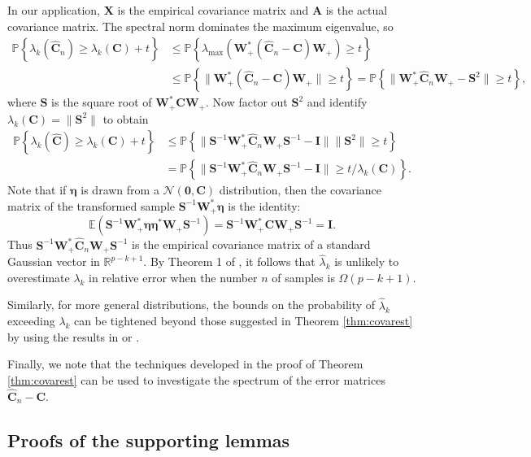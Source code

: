 \documentclass[11pt,letterpaper,twoside,reqno,nosumlimits]{amsart}
\renewcommand{\star}{*}
\newcommand{\mat}[1]{\ensuremath{\bm{#1}}} %
\renewcommand{\vec}[1]{\ensuremath{\bm{#1}}}
\newcommand{\E}{\ensuremath{\mathbb{E}}}
\newcommand{\Prob}[1]{\ensuremath{\mathbb{P}\left\{#1\right\}}}
\newcommand{\R}{\ensuremath{\mathbb{R}}}
\newcommand{\lambdamax}[1]{\ensuremath{\lambda_{\mathrm{max}}\left(#1\right)}}
\theoremstyle{remark}
\numberwithin{equation}{section}
\numberwithin{thm}{section}
\numberwithin{prop}{section}
\numberwithin{defn}{section}
\numberwithin{remark}{section}
\begin{document}
In our application, $\mat{X}$ is the empirical covariance matrix and $\mat{A}$ is the actual covariance matrix. The spectral norm dominates the maximum eigenvalue, so 
\begin{align*}
 \Prob{\lambda_k(\widehat{\mat{C}}_n) \geq \lambda_k(\mat{C}) + t} & \leq \Prob{\lambdamax{\mat{W}_+^\star(\widehat{\mat{C}}_n - \mat{C})\mat{W}_+} \geq t}\\
& \leq \Prob{\|\mat{W}_+^\star (\widehat{\mat{C}}_n - \mat{C}) \mat{W}_+\| \geq t} = \Prob{\|\mat{W}_+^\star \widehat{\mat{C}}_n \mat{W}_+ - \mat{S}^2 \| \geq t },
\end{align*}
where $\mat{S}$ is the square root of $\mat{W}_+^\star \mat{C} \mat{W}_+.$ Now factor out $\mat{S}^2$ and identify $\lambda_k(\mat{C}) = \|\mat{S}^2\|$ to obtain
\begin{align*}
 \Prob{\lambda_k(\widehat{\mat{C}}) \geq \lambda_k(\mat{C}) + t} & \leq \Prob{\|\mat{S}^{-1} \mat{W}_+^\star \widehat{\mat{C}}_n \mat{W}_+ \mat{S}^{-1} - \mathbf{I} \| \|\mat{S}^2\| \geq t } \\
 & = \Prob{\|\mat{S}^{-1} \mat{W}_+^\star \widehat{\mat{C}}_n \mat{W}_+ \mat{S}^{-1} - \mathbf{I} \| \geq t/\lambda_k(\mat{C})}.
\end{align*}
Note that if $\vec{\eta}$ is drawn from a $\mathcal{N}(\vec{0}, \mat{C})$ distribution, then the covariance matrix of the transformed sample $\mat{S}^{-1}\mat{W}_+^\star \vec{\eta}$ is the identity:
\[
\E \left(\mat{S}^{-1}\mat{W}_+^\star \vec{\eta} \vec{\eta}^\star \mat{W}_+ \mat{S}^{-1}\right) = \mat{S}^{-1} \mat{W}_+^\star \mat{C} \mat{W}_+ \mat{S}^{-1} = \mathbf{I}.
\]
Thus $\mat{S}^{-1} \mat{W}_+^\star \widehat{\mat{C}}_n \mat{W}_+ \mat{S}^{-1}$ is the empirical covariance matrix of a standard Gaussian vector in $\R^{p-k+1}.$ By Theorem 1 of \cite{ALPT10b}, it follows that $\hat{\lambda}_k$ is unlikely to overestimate $\lambda_k$ in relative error when the number $n$ of samples is $\Omega(p-k+1).$

Similarly, for more general distributions, the bounds on the probability of $\hat{\lambda}_k$ exceeding $\lambda_k$ can be tightened beyond those suggested in Theorem \ref{thm:covarest} by using the results in \cite{ALPT10b} or \cite{V10}.

Finally, we note that the techniques developed in the proof of Theorem \ref{thm:covarest} can be used to investigate the spectrum of the error matrices $\widehat{\mat{C}}_n - \mat{C}.$
\subsection{Proofs of the supporting lemmas}
\end{document}
